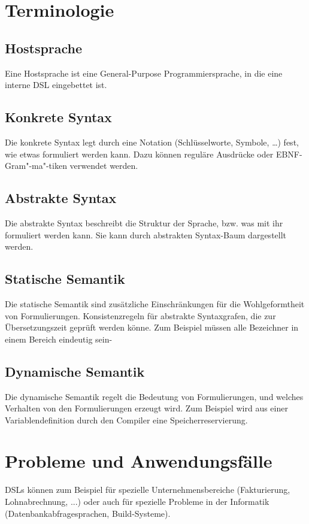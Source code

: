 \documentclass[../InterneDSLs.tex]{subfiles}
\begin{document}
\section{Terminologie}

\subsection{Hostsprache}
Eine Hostsprache ist eine General-Purpose Programmiersprache, in die eine interne DSL eingebettet ist.

\subsection{Konkrete Syntax}
Die konkrete Syntax legt durch eine Notation (Schlüsselworte, Symbole, \ldots) fest, wie etwas formuliert werden kann. Dazu können reguläre Ausdrücke oder EBNF-Gram"-ma"-tiken verwendet werden.

\subsection{Abstrakte Syntax}
Die abstrakte Syntax beschreibt die Struktur der Sprache, bzw. was mit ihr formuliert werden kann. Sie kann durch abstrakten Syntax-Baum dargestellt werden.

\subsection{Statische Semantik}
Die statische Semantik sind zusätzliche Einschränkungen für die Wohlgeformtheit von Formulierungen. Konsistenzregeln für abstrakte Syntaxgrafen, die zur Übersetzungszeit geprüft werden könne. Zum Beispiel müssen alle Bezeichner in einem Bereich eindeutig sein-

\subsection{Dynamische Semantik}
Die dynamische Semantik regelt die Bedeutung von Formulierungen, und welches Verhalten von den Formulierungen erzeugt wird. Zum Beispiel wird aus einer Variablendefinition durch den Compiler eine Speicherreservierung.


\section{Probleme und Anwendungsfälle}
DSLs können zum Beispiel für spezielle Unternehmensbereiche (Fakturierung, Lohnabrechnung, ...) oder auch für spezielle Probleme in der Informatik (Datenbankabfragesprachen, Build-Systeme).
\end{document}
